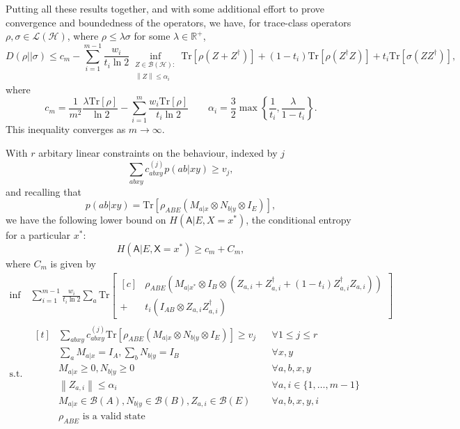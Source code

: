 \documentclass[10pt, a4paper]{article}
\numberwithin{equation}{section} %
\theoremstyle{definition}
\theoremstyle{plain}
\newcommand{\norm}[1]{\left\lVert#1\right\rVert}
\newcommand{\dintv}[2]{\mathopen\{#1,\ldots,#2\mathclose\}}
\newcommand{\?}{\mathrel{?}} %
\newcommand{\R}{\mathbb{R}} %
\newcommand{\Tr}{\mathrm{Tr}} %
\newcommand{\Hs}{\mathcal{H}} %
\newcommand{\sB}{\mathcal{B}}
\newcommand{\crv}[1]{\mathsf{#1}}
\begin{document}
      Putting all these results together, and with some additional effort to prove convergence and boundedness of the operators, we have, for trace-class operators \(\rho, \sigma \in \mathcal{L}(\Hs)\), where \(\rho \leq \lambda\sigma\) for some \(\lambda \in \R^+\),
      \begin{equation}
        D(\rho||\sigma) \leq c_m - \sum_{i=1}^{m-1} \frac{w_i}{t_i \ln 2} \inf_{\substack{Z \in \sB(\Hs) : \\ \norm{Z} \leq \alpha_i}} \Tr\left[\rho\left(Z + Z^{\dagger}\right)\right] + (1-t_i)\Tr\left[\rho\left(Z^{\dagger}Z\right)\right] + t_i\Tr\left[\sigma\left(ZZ^{\dagger}\right)\right],
      \end{equation}
      where
      \begin{equation}
        c_m = \frac{1}{m^2} \frac{\lambda \Tr[\rho]}{\ln 2} - \sum_{i=1}^m \frac{w_i \Tr[\rho]}{t_i \ln 2} \qquad \alpha_i = \frac{3}{2} \max\left\{\frac{1}{t_i}, \frac{\lambda}{1-t_i}\right\}.
      \end{equation}
      This inequality converges as \(m \to \infty\).

      With \(r\) arbitary linear constraints on the behaviour, indexed by \(j\)
      \[ \sum_{abxy} c^{(j)}_{abxy} p(ab|xy) \geq v_j, \]
      and recalling that
      \[ p(ab|xy) = \Tr\left[\rho_{A B E} \left(M_{a|x} \otimes N_{b|y} \otimes I_{E}\right) \right], \]
      we have the following lower bound on \(H(\crv{A}|E, X=x^*)\), the conditional entropy for a particular \(x^*\):
      \begin{equation}
        H(\crv{A}|E, \crv{X}=x^*) \geq c_m + C_m,
      \end{equation}
      where \(C_m\) is given by
      \begin{align}
        \inf & \sum_{i=1}^{m-1} \frac{w_i}{t_i \ln 2} \sum_a \Tr\left[ 
          \begin{aligned}[c]
          & \rho_{A B E} \left(M_{a|x^*} \otimes I_{B} \otimes \left( Z_{a,i} + Z_{a,i}^{\dagger} + (1-t_i)  Z_{a,i}^{\dagger}Z_{a,i}\right) \right) \\
            + & t_i \left( I_{A B} \otimes Z_{a,i}Z_{a,i}^{\dagger}\right)
          \end{aligned}
        \right] \\
        \text{s.t.} & \begin{aligned}[t] 
          & \sum_{abxy} c^{(j)}_{abxy} \Tr\left[\rho_{A B E} \left(M_{a|x} \otimes N_{b|y} \otimes I_{E}\right) \right] \geq v_j & & \forall 1 \leq j \leq r \\
          & \sum_{a} M_{a|x} = I_{A}, \sum_{b} N_{b|y} = I_{B} & & \forall x, y \\
          & M_{a|x} \geq 0, N_{b|y} \geq 0 & & \forall a, b, x, y \\
          & \norm{Z_{a,i}} \leq \alpha_i & & \forall a, i \in \dintv{1}{m-1} \\
          & M_{a|x} \in \sB(A), N_{b|y} \in \sB(B), Z_{a,i} \in \sB(E) & & \forall a, b, x, y, i \\
          & \rho_{A B E} \text{ is a valid state} & &
        \end{aligned}
      \end{align}
\end{document}
